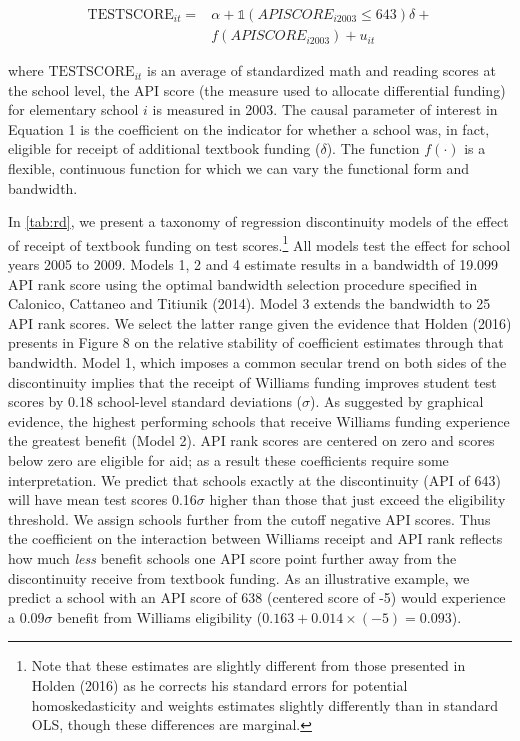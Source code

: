 \documentclass[a4paper, 11pt]{article}
\begin{document}
\begin{enumerate}
\begin{equation} 
\begin{aligned}
\text{TESTSCORE}_{it}= & \alpha+ \mathbb{1} \left(APISCORE_{i2003} \leq 643\right)\delta + \\
& f\left(APISCORE_{i2003}\right)+u_{it}
\label{eq:1}
\end{aligned}
\end{equation}

	where $\text{TESTSCORE}_{it}$ is an average of standardized math and reading scores at the school level, the API score (the measure used to allocate differential funding) for elementary school $i$ is measured in 2003. The causal parameter of interest in Equation 1 is the coefficient on the indicator for whether a school was, in fact, eligible for receipt of additional textbook funding ($\delta$). The function $f(\cdot)$ is a flexible, continuous function for which we can vary the functional form and bandwidth.


	In \autoref{tab:rd}, we present a taxonomy of regression discontinuity models of the effect of receipt of textbook funding on test scores.\footnote{Note that these estimates are slightly different from those presented in Holden (2016) as he corrects his standard errors for potential homoskedasticity and weights estimates slightly differently than in standard OLS, though these differences are marginal.}  All models test the effect for school years 2005 to 2009. Models 1, 2 and 4 estimate results in a bandwidth of 19.099 API rank score using the optimal bandwidth selection procedure specified in Calonico, Cattaneo and Titiunik (2014). Model 3 extends the bandwidth to 25 API rank scores. We select the latter range given the evidence that Holden (2016) presents in Figure 8 on the relative stability of coefficient estimates through that bandwidth. Model 1, which imposes a common secular trend on both sides of the discontinuity implies that the receipt of Williams funding improves student test scores by 0.18 school-level standard deviations ($\sigma$). As suggested by graphical evidence, the highest performing schools that receive Williams funding experience the greatest benefit (Model 2). API rank scores are centered on zero and scores below zero are eligible for aid; as a result these coefficients require some interpretation. We predict that schools exactly at the discontinuity (API of 643) will have mean test scores 0.16$\sigma$ higher than those that just exceed the eligibility threshold. We assign schools further from the cutoff negative API scores. Thus the coefficient on the interaction between Williams receipt and API rank reflects how much \textit{less} benefit schools one API score point further away from the discontinuity receive from textbook funding. As an illustrative example, we predict a school with an API score of 638 (centered score of -5) would experience a 0.09$\sigma$ benefit from Williams eligibility ($0.163+0.014 \times (-5)=0.093$).


\end{enumerate}
\end{document}
